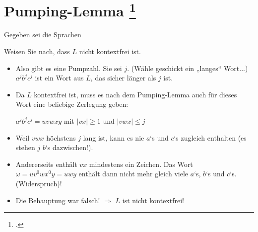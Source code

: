 \documentclass{lehramt-informatik-aufgabe}
\begin{document}
\section{Pumping-Lemma
\footcite[Seite 42]{theo:fs:2}}

Gegeben sei die Sprachen

\begin{center}
\end{center}

\noindent
Weisen Sie nach, dass $L$ nicht kontextfrei ist.

\begin{liExkurs}
\liPumpingKontextfrei
\end{liExkurs}

\begin{liAntwort}
\begin{itemize}
\item Also gibt es eine Pumpzahl. Sie sei $j$.
(Wähle geschickt ein „langes“ Wort...)
$a^j b^j c^j$ ist ein Wort aus $L$, das sicher länger als $j$ ist.

\item Da $L$ kontextfrei ist, muss es nach dem Pumping-Lemma auch für
dieses Wort eine beliebige Zerlegung geben:

$a^j b^j c^j = uvwxy$ mit $|vx| \geq 1$ und $|vwx| \leq j$

\item Weil $vwx$ höchstens $j$ lang ist, kann es nie $a$‘s und $c$‘s
zugleich enthalten (es stehen $j$ $b$‘s dazwischen!).

\item Andererseits enthält $vx$ mindestens ein Zeichen. Das Wort $\omega
= uv^0 wx^0 y = uwy$ enthält dann nicht mehr gleich viele $a$‘s, $b$‘s
und $c$‘s. (Widerspruch)!

\item Die Behauptung war falsch! $\Rightarrow$ $L$ ist nicht kontextfrei!
\end{itemize}
\end{liAntwort}
\end{document}
